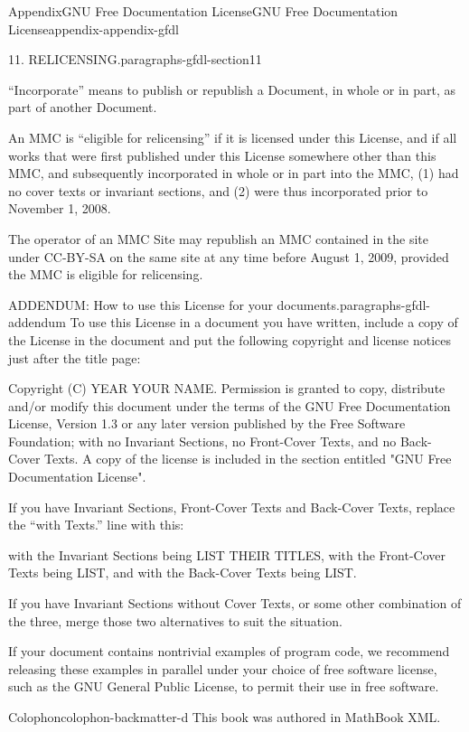 \documentclass[twoside,10pt,]{book}
\makeatletter
\def\cleardoublepage{%
\clearpage\ifodd\c@page\else\thispagestyle{empty}\hbox{}\newpage\if@twocolumn\hbox{}\newpage\fi\fi%
}
\newcommand{\xreffont}{\relax}
\numberwithin{equation}{part}
\providecommand\phantomsection{}
\makeatother
\begin{document}
\begin{appendixptx}{Appendix}{GNU Free Documentation License}{}{GNU Free Documentation License}{}{}{appendix-appendix-gfdl}
\begin{paragraphs}{11. RELICENSING.}{paragraphs-gfdl-section11}
\par
``Incorporate'' means to publish or republish a Document, in whole or in part, as part of another Document.%
\par
An MMC is ``eligible for relicensing'' if it is licensed under this License, and if all works that were first published under this License somewhere other than this MMC, and subsequently incorporated in whole or in part into the MMC, (1) had no cover texts or invariant sections, and (2) were thus incorporated prior to November 1, 2008.%
\par
The operator of an MMC Site may republish an MMC contained in the site under CC-BY-SA on the same site at any time before August 1, 2009, provided the MMC is eligible for relicensing.%
\end{paragraphs}%
\begin{paragraphs}{ADDENDUM: How to use this License for your documents.}{paragraphs-gfdl-addendum}%
To use this License in a document you have written, include a copy of the License in the document and put the following copyright and license notices just after the title page:%
\begin{preformatted}
Copyright (C)  YEAR  YOUR NAME.
Permission is granted to copy, distribute and/or modify this document
under the terms of the GNU Free Documentation License, Version 1.3
or any later version published by the Free Software Foundation;
with no Invariant Sections, no Front-Cover Texts, and no Back-Cover Texts.
A copy of the license is included in the section entitled "GNU
Free Documentation License".
\end{preformatted}
If you have Invariant Sections, Front-Cover Texts and Back-Cover Texts, replace the ``with\textellipsis{} Texts.'' line with this:%
\begin{preformatted}
with the Invariant Sections being LIST THEIR TITLES, with the
Front-Cover Texts being LIST, and with the Back-Cover Texts being LIST.
\end{preformatted}
If you have Invariant Sections without Cover Texts, or some other combination of the three, merge those two alternatives to suit the situation.%
\par
If your document contains nontrivial examples of program code, we recommend releasing these examples in parallel under your choice of free software license, such as the GNU General Public License, to permit their use in free software.%
\end{paragraphs}%
\end{appendixptx}
%
\backmatter%
%
\clearpage\phantomsection%
%
%
{\xreffont\printindex}
%
\cleardoublepage
\pagestyle{empty}
\begin{backcolophon}{Colophon}{colophon-backmatter-d}%
This book was authored in MathBook XML.%
\end{backcolophon}%
\end{document}
